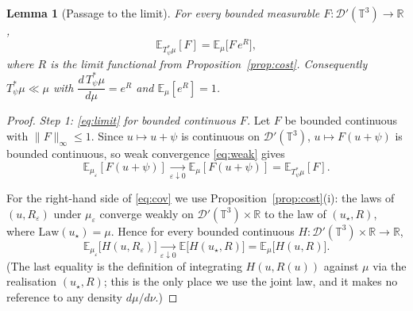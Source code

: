 \documentclass[12pt]{article}
\newtheorem{lemma}{Lemma}
\theoremstyle{definition}
\newcommand{\T}{\mathbb{T}^3}
\newcommand{\R}{\mathbb{R}}
\newcommand{\E}{\mathbb{E}}
\newcommand{\D}{\mathcal{D}'(\T)}
\begin{document}
\begin{lemma}[Passage to the limit]\label{lem:limit}
For every bounded measurable $F\colon\D\to\R$,
\begin{equation}\label{eq:limit}
  \E_{T_\psi^{*}\mu}\![F]=\E_\mu\!\big[F\,e^{R}\big],
\end{equation}
where $R$ is the limit functional from Proposition~\ref{prop:cost}. Consequently
$T_\psi^{*}\mu\ll\mu$ with $\dfrac{d\,T_\psi^{*}\mu}{d\mu}=e^{R}$ and $\E_\mu[e^R]=1$.
\end{lemma}

\begin{proof}
\emph{Step 1: \eqref{eq:limit} for bounded continuous $F$.}
Let $F$ be bounded continuous with $\|F\|_\infty\le1$. Since $u\mapsto u+\psi$ is
continuous on $\D$, $u\mapsto F(u+\psi)$ is bounded continuous, so weak convergence
\eqref{eq:weak} gives
\begin{equation}\label{eq:lhs}
  \E_{\mu_\varepsilon}[F(u+\psi)]\xrightarrow[\varepsilon\downarrow0]{}\E_\mu[F(u+\psi)]
  =\E_{T_\psi^{*}\mu}[F].
\end{equation}

For the right-hand side of \eqref{eq:cov} we use Proposition~\ref{prop:cost}(i): the laws
of $(u,R_\varepsilon)$ under $\mu_\varepsilon$ converge weakly on $\D\times\R$ to the law of
$(u_\star,R)$, where $\mathrm{Law}(u_\star)=\mu$. Hence for every bounded continuous
$H\colon\D\times\R\to\R$,
\begin{equation}\label{eq:joint}
  \E_{\mu_\varepsilon}\big[H(u,R_\varepsilon)\big]
  \xrightarrow[\varepsilon\downarrow0]{}\E\big[H(u_\star,R)\big]=\E_\mu\big[H(u,R)\big].
\end{equation}
(The last equality is the definition of integrating $H(u,R(u))$ against $\mu$ via the
realisation $(u_\star,R)$; this is the only place we use the joint law, and it makes no
reference to any density $d\mu/d\nu$.)


\end{proof}
\end{document}
